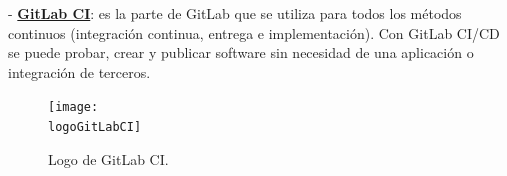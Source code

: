 


    - \textbf{\underline{GitLab CI}}: es la parte de GitLab que se utiliza para todos los métodos continuos (integración continua, entrega e implementación). Con GitLab CI/CD se puede probar, crear y publicar software sin necesidad de una aplicación o integración de terceros.
\begin{figure}[h]
    \centering
    \texttt{[image: \\logoGitLabCI]}
    \caption{Logo de GitLab CI.}
\end{figure}

